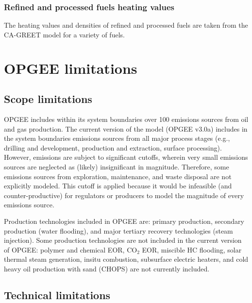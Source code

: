 \documentclass[11pt]{report}
\newcommand{\version}{v3.0a}
\begin{document}
\subsection{Refined and processed fuels heating values}

The  heating values and densities of refined and processed fuels are taken from the CA-GREET model \cite{Wang2009} for a variety of fuels. 




\chapter{OPGEE limitations}




\section{Scope limitations}

OPGEE includes within its system boundaries over 100 emissions sources from oil and gas production. The current version of the model (OPGEE \version) includes in the system boundaries emissions sources from all major process stages (e.g., drilling and development, production and extraction, surface processing). However, emissions are subject to significant cutoffs, wherein very small emissions sources are neglected as (likely) insignificant in magnitude. Therefore, some emissions sources from exploration, maintenance, and waste disposal are not explicitly modeled. This cutoff is applied because it would be infeasible (and counter-productive) for regulators or producers to model the magnitude of every emissions source.

Production technologies included in OPGEE are: primary production, secondary production (water flooding), and major tertiary recovery technologies (steam injection). Some production technologies are not included in the current version of OPGEE: polymer and chemical EOR, CO$_2$ EOR, miscible HC flooding, solar thermal steam generation, insitu combustion, subsurface electric heaters, and cold heavy oil production with sand (CHOPS) are not currently included.




\section{Technical limitations}
\end{document}
